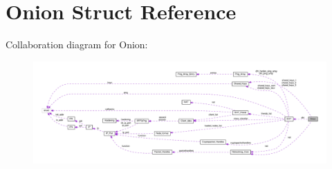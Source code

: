 \hypertarget{struct_onion}{\section{Onion Struct Reference}
\label{struct_onion}
}


Collaboration diagram for Onion\+:\nopagebreak
\begin{figure}[H]
\begin{center}
\leavevmode
\includegraphics[width=350pt]{struct_onion__coll__graph}
\end{center}
\end{figure}
